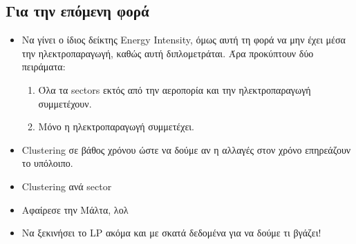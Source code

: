 \documentclass[a4paper,twoside,10pt]{article}
\begin{document}
\subsection{Για την επόμενη φορά}
\begin{itemize}
	\item Να γίνει ο ίδιος δείκτης Energy Intensity, όμως αυτή τη φορά να μην έχει μέσα την ηλεκτροπαραγωγή, καθώς αυτή διπλομετράται. Άρα προκύπτουν δύο πειράματα:
	\begin{enumerate}
		\item Όλα τα sectors εκτός από την αεροπορία και την ηλεκτροπαραγωγή συμμετέχουν.
		\item Μόνο η ηλεκτροπαραγωγή συμμετέχει.
	\end{enumerate}
	\item Clustering σε βάθος χρόνου ώστε να δούμε αν η αλλαγές στον χρόνο επηρεάζουν το υπόλοιπο. 
	\item Clustering ανά sector 
	\item Αφαίρεσε την Μάλτα, λολ
	\item Να ξεκινήσει το LP ακόμα και με σκατά δεδομένα για να δούμε τι βγάζει!
\end{itemize}
\end{document}
